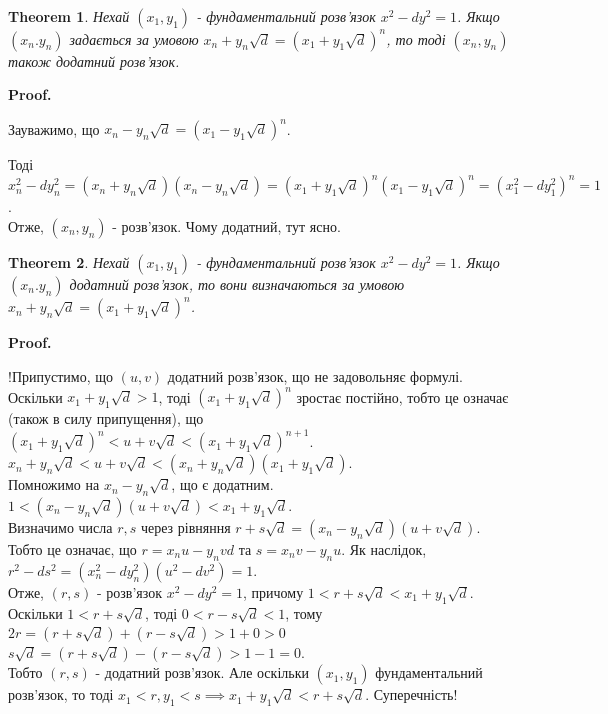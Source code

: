 \documentclass[a4paper, 10pt]{article}
\makeatletter
\theoremstyle{theoremdd}
\newtheorem{theorem}{Theorem}[subsection]
\theoremstyle{theoremdd}
\theoremstyle{theoremdd}
\theoremstyle{theoremdd}
\theoremstyle{theoremdd}
\theoremstyle{theoremdd}
\theoremstyle{theoremdd}
\theoremstyle{theoremdd}
\renewenvironment{proof}[1][Proof.\\]{\par
\pushQED{\hfill \qed}%
\normalfont \topsep6\p@\@plus6\p@\relax
\trivlist
\item\relax
{\bfseries
#1\@addpunct{.}}\hspace\labelsep\ignorespaces
}{%
\popQED\endtrivlist\@endpefalse
}
\makeatother
\begin{document}
\begin{theorem}
Нехай $(x_1,y_1)$ - фундаментальний розв'язок $x^2 - dy^2 = 1$. Якщо $(x_n.y_n)$ задається за умовою $x_n + y_n \sqrt{d} = \left(x_1 + y_1 \sqrt{d}\right)^n$, то тоді $(x_n,y_n)$ також додатний розв'язок.
\end{theorem}

\begin{proof}
Зауважимо, що $x_n - y_n \sqrt{d} = \left(x_1 - y_1 \sqrt{d} \right)^n$.

Тоді\\
$x_n^2 - dy_n^2 = \left( x_n + y_n \sqrt{d} \right)\left( x_n - y_n \sqrt{d} \right) = \left( x_1 + y_1 \sqrt{d} \right)^n \left( x_1 - y_1 \sqrt{d} \right)^n = (x_1^2 - dy_1^2)^n = 1$.\\
Отже, $(x_n,y_n)$ - розв'язок. Чому додатний, тут ясно.
\end{proof}

\begin{theorem}
Нехай $(x_1,y_1)$ - фундаментальний розв'язок $x^2 - dy^2 = 1$. Якщо $(x_n.y_n)$ додатний розв'язок, то вони визначаються за умовою $x_n + y_n \sqrt{d} = \left(x_1 + y_1 \sqrt{d}\right)^n$.
\end{theorem}

\begin{proof}
!Припустимо, що $(u,v)$ додатний розв'язок, що не задовольняє формулі. Оскільки $x_1 + y_1 \sqrt{d} > 1$, тоді $\left(x_1 + y_1 \sqrt{d}\right)^n$ зростає постійно, тобто це означає (також в силу припущення), що\\
$\left(x_1 + y_1 \sqrt{d} \right)^n < u + v \sqrt{d} < \left( x_1 + y_1 \sqrt{d} \right)^{n+1}$.\\
$x_n + y_n \sqrt{d} < u + v \sqrt{d} < \left( x_n + y_n \sqrt{d}\right) \left( x_1 + y_1 \sqrt{d}\right)$.\\
Помножимо на $x_n - y_n \sqrt{d}$, що є додатним.\\
$1 < \left(x_n - y_n \sqrt{d}\right)\left( u + v \sqrt{d} \right) < x_1 + y_1 \sqrt{d}$.\\
Визначимо числа $r,s$ через рівняння $r + s \sqrt{d} = \left( x_n - y_n \sqrt{d} \right)\left( u + v \sqrt{d} \right)$. Тобто це означає, що $r = x_n u - y_n vd$ та $s = x_n v - y_n u$. Як наслідок,\\
$r^2 - ds^2 = (x_n^2 - dy_n^2) (u^2-dv^2) = 1$.\\
Отже, $(r,s)$ - розв'язок $x^2 - dy^2 = 1$, причому $1 < r + s \sqrt{d} < x_1 + y_1 \sqrt{d}$.\\
Оскільки $1 < r + s \sqrt{d}$, тоді $0 < r - s \sqrt{d} < 1$, тому\\
$2r = \left(r+s \sqrt{d} \right)  + \left(r- s \sqrt{d}\right) > 1 + 0 > 0$\\
$s \sqrt{d} = \left(r + s \sqrt{d}\right) - \left(r - s \sqrt{d}\right) > 1 - 1  = 0$.\\
Тобто $(r,s)$ - додатний розв'язок. Але оскільки $(x_1,y_1)$ фундаментальний розв'язок, то тоді $x_1 < r, y_1 < s \implies x_1 + y_1 \sqrt{d} < r + s \sqrt{d}$. Суперечність!
\end{proof}
\newpage
\end{document}
